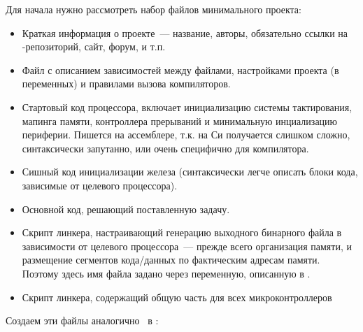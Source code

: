 
\label{labhello}

Для начала нужно рассмотреть набор файлов минимального проекта:

\begin{itemize}

\item {}

Краткая информация о проекте\ --- название, авторы, обязательно ссылки на
\git-репозиторий, сайт, форум, и т.п.
 
\item {}

Файл с описанием зависимостей между файлами, настройками проекта (в переменных)
и правилами вызова компиляторов.

\item {}

Стартовый код процессора, включает инициализацию системы тактирования, мапинга
памяти, контроллера прерываний и минимальную инциализацию периферии.
Пишется на ассемблере, т.к. на Си получается слишком сложно, синтаксически
запутанно, или очень специфично для компилятора.

\item {}

Сишный код инициализации железа (синтаксически легче описать блоки кода,
зависимые от целевого процессора).

\item {}

Основной код, решающий поставленную задачу. 

\item {}

Скрипт линкера, настраивающий генерацию выходного бинарного файла в 
зависимости от целевого процессора\ --- прежде всего организация памяти,
и размещение сегментов кода/данных по фактическим адресам памяти.
Поэтому здесь имя файла задано через переменную, описанную в \makefile.

\item {}

Скрипт линкера, содержащий общую часть для всех микроконтроллеров

\end{itemize}

\bigskip Создаем эти файлы аналогично \makefile\ в :

\bigskip{}










